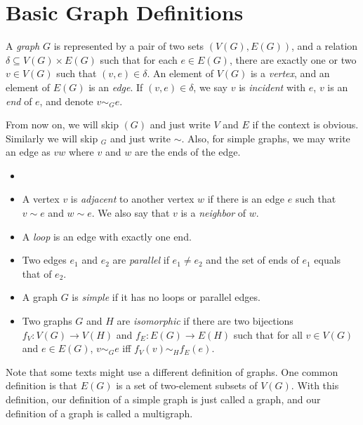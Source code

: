 

    \section{Basic Graph Definitions}
        
        \begin{defn}[Graph] \label{def_graph}
            A \emph{graph} $G$ is represented by a pair of two sets $(V(G), E(G))$, and a relation $\delta \subseteq V(G) \times E(G)$ such that for each $e \in E(G)$, there are exactly one or two $v \in V(G)$ such that $(v,e) \in \delta$. An element of $V(G)$ is a \emph{vertex}, and an element of $E(G)$ is an \emph{edge}. If $(v,e) \in \delta$, we say $v$ is \emph{incident} with $e$, $v$ is an \emph{end} of $e$, and denote $v \sim _G e$.
        \end{defn}
        
        From now on, we will skip $(G)$ and just write $V$ and $E$ if the context is obvious. Similarly we will skip $_G$ and just write $\sim$. Also, for simple graphs, we may write an edge as $vw$ where $v$ and $w$ are the ends of the edge.
        
        \begin{defn} \label{def_graph_terms} \begin{itemize}
            \item[]
            \item A vertex $v$ is \emph{adjacent} to another vertex $w$ if there is an edge $e$ such that $v \sim e$ and $w \sim e$. We also say that $v$ is a \emph{neighbor} of $w$.
            \item A \emph{loop} is an edge with exactly one end.
            \item Two edges $e_1$ and $e_2$ are \emph{parallel} if $e_1 \neq e_2$ and the set of ends of $e_1$ equals that of $e_2$.
            \item A graph $G$ is \emph{simple} if it has no loops or parallel edges.
            \item Two graphs $G$ and $H$ are \emph{isomorphic} if there are two bijections $f_V : V(G) \to V(H)$ and $f_E : E(G) \to E(H)$ such that for all $v \in V(G)$ and $e \in E(G)$, $v \sim_G e$ iff $f_V(v) \sim_H f_E(e)$.
        \end{itemize} \end{defn}
        
        Note that some texts might use a different definition of graphs. One common definition is that $E(G)$ is a set of two-element subsets of $V(G)$. With this definition, our definition of a simple graph is just called a graph, and our definition of a graph is called a multigraph.
        
